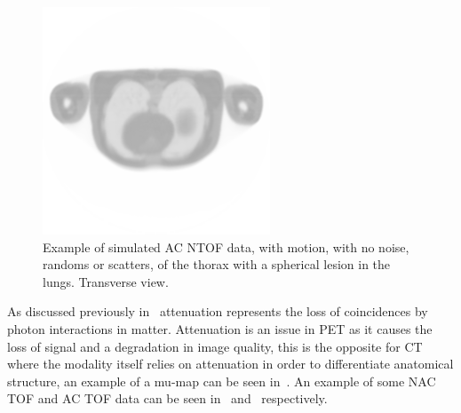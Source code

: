                 \begin{figure} %
                    \centering
                    
                    \includegraphics[width=1.0\linewidth]{figures/background_ac_example.png}
                    
                    \captionsetup{singlelinecheck=false, justification=raggedright}
                    \caption{Example of simulated \gls{AC} \gls{NTOF} data, with motion, with no noise, randoms or scatters, of the thorax with a spherical lesion in the lungs. Transverse view.} \label{fig:combined_pet_ct_ac_tof_example}
                \end{figure}
                
                As discussed previously in~ attenuation represents the loss of coincidences by photon interactions in matter. Attenuation is an issue in \gls{PET} as it causes the loss of signal and a degradation in image quality, this is the opposite for \gls{CT} where the modality itself relies on attenuation in order to differentiate anatomical structure, an example of a \gls{mu-map} can be seen in~. An example of some \gls{NAC} \gls{TOF} and \gls{AC} \gls{TOF} data can be seen in~ and~ respectively. %
                
